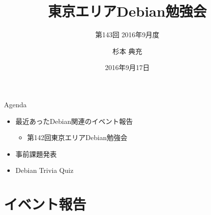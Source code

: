 \title{東京エリアDebian勉強会}
\subtitle{第143回 2016年9月度}
\author{杉本 典充}
\date{2016年9月17日}



\begin{frame}
\titlepage{}
\end{frame}

\begin{frame}{Agenda}
 \begin{minipage}[t]{0.45\hsize}
  \begin{itemize}
  \item 最近あったDebian関連のイベント報告
	\begin{itemize}
	\item 第142回東京エリアDebian勉強会
	\end{itemize}
  \item 事前課題発表
  \end{itemize}
 \end{minipage}
 \begin{minipage}[t]{0.45\hsize}
  \begin{itemize}
   \item Debian Trivia Quiz
  \end{itemize}
 \end{minipage}
\end{frame}

\section{イベント報告}

